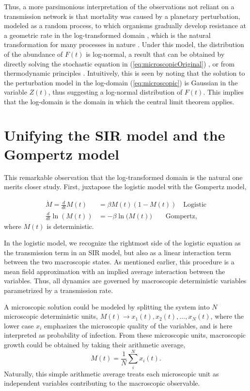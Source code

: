 \documentclass{article}
\begin{document}
Thus, a more parsimonious interpretation of the observations not reliant on a transmission network is that mortality was caused by a planetary perturbation, modeled as a random process, to which organisms gradually develop resistance at a geometric rate in the log-transformed domain \citep{boxenbaum2017hypotheses,neafsey1988gompertz}, which is the natural transformation for many processes in nature \citep{zhang1994log}. 
Under this model, the distribution of the abundance of $F(t)$ is log-normal, a result that can be obtained by directly solving the stochastic equation in (\ref{eq:microscopicOriginal}) \citep{skiadas2010exact,petroni2020gompertz}, or from thermodynamic principles \citep{sitaram1984statistical,gunasekaran1982lon,chakrabarti1996non}. 
Intuitively, this is seen by noting that the solution to the perturbation model in the log-domain (\ref{eq:microscopic}) is Gaussian in the variable $Z(t)$, thus suggesting a log-normal distribution of $F(t)$. This implies that the log-domain is the domain in which the central limit theorem applies.

\section{Unifying the SIR model and the Gompertz model}
This remarkable observation that the log-transformed domain is the natural one merits closer study. First, juxtapose the logistic model with the Gompertz model,

\begin{subequations}
\begin{align}
\dot{M} = \frac{d}{dt}M(t) & = \beta M(t) (1-M(t)) \quad \text{Logistic}\label{eq:compareLog}\\ 
\frac{d}{dt}\ln{(M(t))} & = -\beta \ln{(M(t)}) \quad\quad\text{Gompertz}\label{eq:compareGom},
\end{align}
\end{subequations}
where $M(t)$ is deterministic. 

In the logistic model, we recognize the rightmost side of the logistic equation as the transmission term in an SIR model, but also as a linear interaction term between the two macroscopic states. 
As mentioned earlier, this procedure is a mean field approximation with an implied average interaction between the variables. 
Thus, all dynamics are governed by macroscopic deterministic variables parametrized by a transmission rate.

A microscopic solution could be modeled by splitting the system into $N$ microscopic deterministic units, $M(t) \rightarrow x_1(t), x_2(t), ..., x_N(t)$, where the lower case $x_i$ emphasizes the microscopic quality of the variables, and is here interpreted as probability of infection. From these microscopic units, macroscopic growth could be obtained by taking their arithmetic average,
\begin{equation}
M(t) = \frac{1}{N}\sum_i^N x_i(t).
\end{equation}
Naturally, this simple arithmetic average treats each microscopic unit as independent variables contributing to the macroscopic observable.
\end{document}
